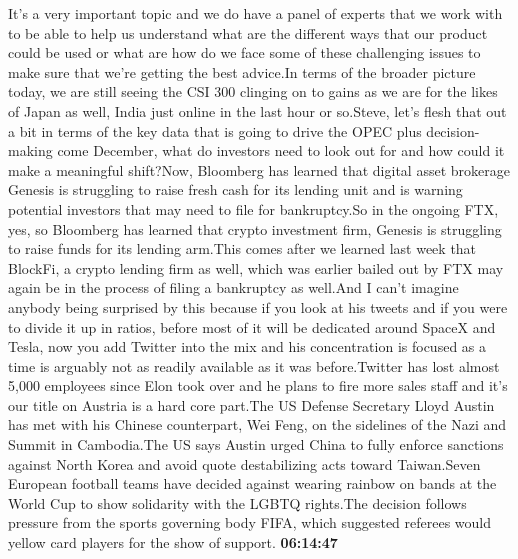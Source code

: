 \documentclass{article}%
\begin{document}
It's a very important topic and we do have a panel of experts that we work with to be able to help us understand what are the different ways that our product could be used or what are how do we face some of these challenging issues to make sure that we're getting the best advice.In terms of the broader picture today, we are still seeing the CSI 300 clinging on to gains as we are for the likes of Japan as well, India just online in the last hour or so.Steve, let's flesh that out a bit in terms of the key data that is going to drive the OPEC plus decision{-}making come December, what do investors need to look out for and how could it make a meaningful shift?Now, Bloomberg has learned that digital asset brokerage Genesis is struggling to raise fresh cash for its lending unit and is warning potential investors that may need to file for bankruptcy.So in the ongoing FTX, yes, so Bloomberg has learned that crypto investment firm, Genesis is struggling to raise funds for its lending arm.This comes after we learned last week that BlockFi, a crypto lending firm as well, which was earlier bailed out by FTX may again be in the process of filing a bankruptcy as well.And I can't imagine anybody being surprised by this because if you look at his tweets and if you were to divide it up in ratios, before most of it will be dedicated around SpaceX and Tesla, now you add Twitter into the mix and his concentration is focused as a time is arguably not as readily available as it was before.Twitter has lost almost 5,000 employees since Elon took over and he plans to fire more sales staff and it's our title on Austria is a hard core part.The US Defense Secretary Lloyd Austin has met with his Chinese counterpart, Wei Feng, on the sidelines of the Nazi and Summit in Cambodia.The US says Austin urged China to fully enforce sanctions against North Korea and avoid quote destabilizing acts toward Taiwan.Seven European football teams have decided against wearing rainbow on bands at the World Cup to show solidarity with the LGBTQ rights.The decision follows pressure from the sports governing body FIFA, which suggested referees would yellow card players for the show of support.%
\textbf{06:14:47}%
\newline%
\end{document}
